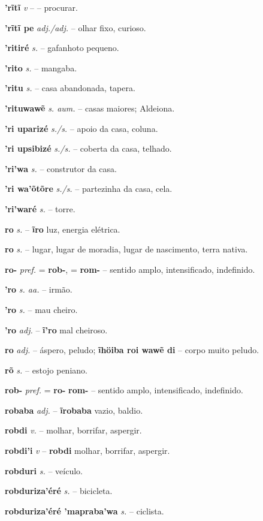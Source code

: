 \textbf{'rĩtĩ} \textit{v} -- -- procurar.

\textbf{'rĩtĩ pe} \textit{adj./adj.} -- olhar fixo, curioso.

\textbf{'ritiré} \textit{s.} -- gafanhoto pequeno.

\textbf{'rito} \textit{s.} -- mangaba.

\textbf{'ritu} \textit{s.} -- casa abandonada, tapera.

\textbf{'rituwawẽ} \textit{s. aum.} -- casas maiores; Aldeiona.

\textbf{'ri uparizé} \textit{s./s.} -- apoio da casa, coluna.

\textbf{'ri upsibizé} \textit{s./s.} -- coberta da casa, telhado.

\textbf{'ri'wa} \textit{s.} -- construtor da casa.

\textbf{'ri wa'õtõre} \textit{s./s.} -- partezinha da casa, cela.

\textbf{'ri'waré} \textit{s.} -- torre.

\textbf{ro} \textit{s.} -- \textbf{ĩro} luz, energia elétrica.

\textbf{ro} \textit{s.} -- lugar, lugar de moradia, lugar de nascimento, terra nativa.

\textbf{ro-} \textit{pref.} = \textbf{rob-}, = \textbf{rom-} -- sentido amplo, intensificado, indefinido.

\textbf{'ro} \textit{s. aa.} -- irmão.

\textbf{'ro} \textit{s.} -- mau cheiro.

\textbf{'ro} \textit{adj.} -- \textbf{ĩ'ro} mal cheiroso.

\textbf{ro} \textit{adj.} -- áspero, peludo; \textbf{ĩhöiba roi wawẽ di} -- corpo muito peludo.

\textbf{rõ} \textit{s.} -- estojo peniano.

\textbf{rob-} \textit{pref.} = \textbf{ro-} \textbf{rom-} -- sentido amplo, intensificado, indefinido.

\textbf{robaba} \textit{adj.} -- \textbf{ĩrobaba} vazio, baldio.

\textbf{robdi} \textit{v.} -- molhar, borrifar, aspergir.

\textbf{robdi'i} \textit{v} -- \textbf{robdi} molhar, borrifar, aspergir.

\textbf{robduri} \textit{s.} -- veículo.

\textbf{robduriza'éré} \textit{s.} -- bicicleta.

\textbf{robduriza'éré 'mapraba'wa} \textit{s.} -- ciclista.

